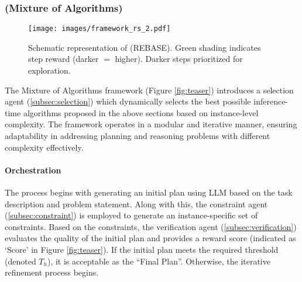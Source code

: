 
\subsubsection{\plangen{} (Mixture of Algorithms)}

\begin{wrapfigure}{r}{0.45\textwidth}
    \centering
    \vspace{-12mm}
    \texttt{[image: images/framework\_rs\_2.pdf]}
    \vspace{-3mm}
    \caption{Schematic representation of \plangen{} (REBASE). Green shading indicates step reward (darker $=$ higher).  Darker steps prioritized for exploration.}
    \label{fig:rebase}
\end{wrapfigure}The Mixture of Algorithms framework (Figure \ref{fig:teaser}) introduces a selection agent (\textsection \ref{subsec:selection}) which dynamically selects the best possible inference-time algorithms proposed in the above sections based on instance-level complexity. The framework operates in a modular and iterative manner, ensuring adaptability in addressing planning and reasoning problems with different complexity effectively.


\paragraph{Orchestration} 
The process begins with generating an initial plan using LLM based on the task description and problem statement. Along with this, the constraint agent (\textsection \ref{subsec:constraint}) is employed to generate an instance-specific set of constraints. Based on the constraints, the verification agent (\textsection \ref{subsec:verification}) evaluates the quality of the initial plan and provides a reward score (indicated as `Score' in Figure \ref{fig:teaser}). If the initial plan meets the required threshold (denoted $T_h$), it is acceptable as the ``Final Plan''. Otherwise, the iterative refinement process begins.

